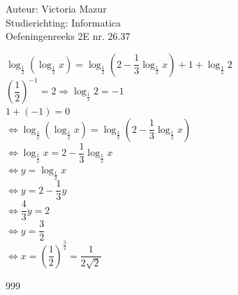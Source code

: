 \documentclass[a4paper]{article}
\begin{document}
  
\noindent \large Auteur: Victoria Mazur \\
\noindent \large Studierichting: Informatica\\
\noindent \large Oefeningenreeks 2E nr. 26.37\\

\medskip

\normalsize

$\log_{\tfrac{1}{2}} \left( \log_{\tfrac{1}{2}} x \right) = \log_{\tfrac{1}{2}} \left( 2 - \dfrac{1}{3} \log_{\tfrac{1}{2}} x \right) + 1 + \log_{\tfrac{1}{2}} 2$ \\

$\left( \dfrac{1}{2} \right)^{-1} = 2 \Rightarrow \log_{\tfrac{1}{2}} 2 = -1$ \\

$1 + (-1) = 0$ \\

$\Leftrightarrow \log_{\tfrac{1}{2}} \left( \log_{\tfrac{1}{2}} x \right) = \log_{\tfrac{1}{2}} \left( 2 - \dfrac{1}{3} \log_{\tfrac{1}{2}} x \right)$ \\

$\Leftrightarrow \log_{\tfrac{1}{2}} x = 2 - \dfrac{1}{3} \log_{\tfrac{1}{2}} x$ \\

$\Leftrightarrow y = \log_{\tfrac{1}{2}} x$ \\

$\Leftrightarrow y = 2 - \dfrac{1}{3} y$ \\

$\Leftrightarrow \dfrac{4}{3} y = 2$ \\

$\Leftrightarrow y = \dfrac{3}{2}$ \\

$\Leftrightarrow x = \left( \dfrac{1}{2} \right)^{\tfrac{3}{2}} = \dfrac{1}{2\sqrt{2}}$ \\

\begin{thebibliography}{999}
\end{thebibliography}
\end{document}
